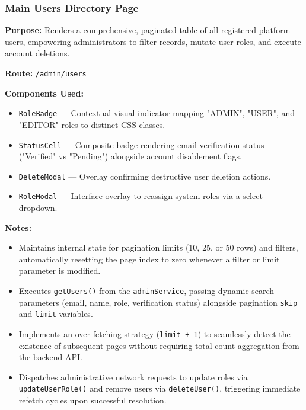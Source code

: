 \subsubsection{Main Users Directory Page}

\textbf{Purpose:} Renders a comprehensive, paginated table of all registered platform users, empowering administrators to filter records, mutate user roles, and execute account deletions.

\vspace{0.2cm}
\noindent\textbf{Route:} \texttt{/admin/users}

\vspace{0.2cm}
\noindent\textbf{Components Used:}
\begin{itemize}
    \item \texttt{RoleBadge} --- Contextual visual indicator mapping "ADMIN", "USER", and "EDITOR" roles to distinct CSS classes.
    \item \texttt{StatusCell} --- Composite badge rendering email verification status ("Verified" vs "Pending") alongside account disablement flags.
    \item \texttt{DeleteModal} --- Overlay confirming destructive user deletion actions.
    \item \texttt{RoleModal} --- Interface overlay to reassign system roles via a select dropdown.
\end{itemize}

\vspace{0.2cm}
\noindent\textbf{Notes:}
\begin{itemize}
    \item Maintains internal state for pagination limits (10, 25, or 50 rows) and filters, automatically resetting the page index to zero whenever a filter or limit parameter is modified.
    \item Executes \texttt{getUsers()} from the \texttt{adminService}, passing dynamic search parameters (email, name, role, verification status) alongside pagination \texttt{skip} and \texttt{limit} variables.
    \item Implements an over-fetching strategy (\texttt{limit + 1}) to seamlessly detect the existence of subsequent pages without requiring total count aggregation from the backend API.
    \item Dispatches administrative network requests to update roles via \texttt{updateUserRole()} and remove users via \texttt{deleteUser()}, triggering immediate refetch cycles upon successful resolution.
\end{itemize}

